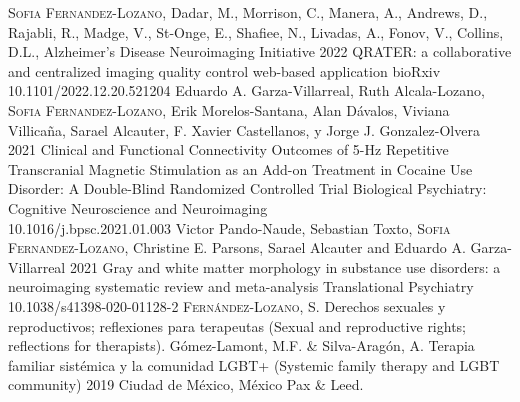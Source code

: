 \vspace{-3mm}
{
\setlength\tabcolsep{0pt} \setlength{\extrarowheight}{0pt}%
\begin{itemize}[leftmargin=5ex, nosep, noitemsep, itemindent=-13pt,
    label=\raisebox{0.25ex}{\tiny$\bullet$}]%
    \vspace{-1.8mm}%
    \cvarticle
    {{\scshape{Sofia Fernandez-Lozano}}, Dadar, M., Morrison, C., Manera, A.,
    Andrews, D., Rajabli, R., Madge, V., St-Onge, E., Shafiee, N., Livadas, A.,
    Fonov, V., Collins, D.L., Alzheimer's Disease Neuroimaging Initiative}
    {2022}
    {QRATER: a collaborative and centralized imaging quality control web-based
    application}
    {bioRxiv}
    {\\10.1101/2022.12.20.521204}
    \cvarticle
    {Eduardo A. Garza-Villarreal, Ruth Alcala-Lozano,
      {\scshape{Sofia Fernandez-Lozano}}, Erik Morelos-Santana,
      Alan Dávalos, Viviana Villicaña, Sarael Alcauter,
      F. Xavier Castellanos, y Jorge J. Gonzalez-Olvera}
    {2021}
    {Clinical and Functional Connectivity Outcomes of 5-Hz Repetitive Transcranial Magnetic Stimulation as an Add-on Treatment in Cocaine Use Disorder: A Double-Blind Randomized Controlled Trial}
    {Biological Psychiatry: Cognitive Neuroscience and Neuroimaging}
    {\\10.1016/j.bpsc.2021.01.003}
    \cvarticle
    {Victor Pando-Naude, Sebastian Toxto, {\scshape{Sofia Fernandez-Lozano}},
      Christine E. Parsons, Sarael Alcauter and Eduardo A. Garza-Villarreal}
    {2021}
    {Gray and white matter morphology in substance use disorders: a neuroimaging systematic review and meta-analysis}
    {Translational Psychiatry}
    {\\10.1038/s41398-020-01128-2}
    \cvchapt
    {\scshape{Fernández-Lozano, S.}}
        {Derechos sexuales y reproductivos; reflexiones para terapeutas
        (Sexual and reproductive rights; reflections for therapists).}
        {Gómez-Lamont, M.F. \& Silva-Aragón, A.}
        {Terapia familiar sistémica y la comunidad LGBT+ (Systemic family therapy and
        LGBT community)}
        {2019}
        {Ciudad de México, México}
        {Pax \& Leed.}
\end{itemize}
}
